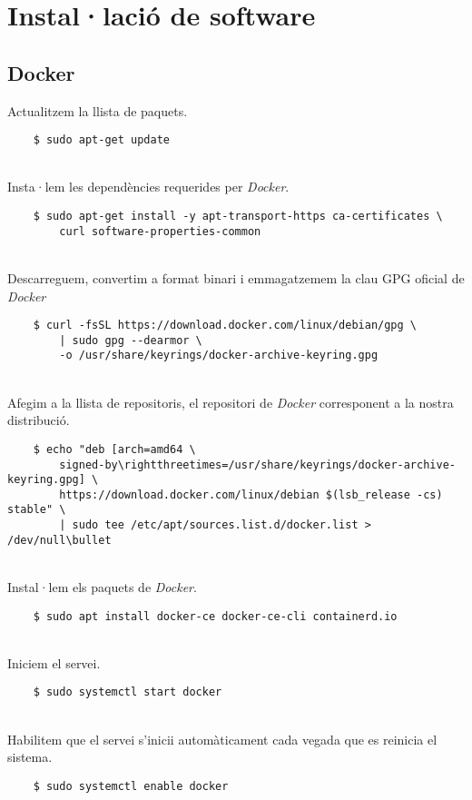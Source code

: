 \chapter{Instal·lació de software}\label{ch:software-installation}

\section{\gls{Docker}}\label{sec:docker-installation}

Actualitzem la llista de paquets.
\begin{verbatim}
    $ sudo apt-get update
\end{verbatim}

\noindent \\
    Insta·lem les dependències requerides per \textit{\gls{Docker}}.
\begin{verbatim}
    $ sudo apt-get install -y apt-transport-https ca-certificates \
        curl software-properties-common
\end{verbatim}

\noindent \\
Descarreguem, convertim a format binari i emmagatzemem la clau GPG oficial de \textit{\gls{Docker}}
\begin{verbatim}
    $ curl -fsSL https://download.docker.com/linux/debian/gpg \
        | sudo gpg --dearmor \
        -o /usr/share/keyrings/docker-archive-keyring.gpg
\end{verbatim}

\noindent \\
Afegim a la llista de repositoris, el repositori de \textit{\gls{Docker}} corresponent a la nostra distribució.
\begin{verbatim}
    $ echo "deb [arch=amd64 \
        signed-by\rightthreetimes=/usr/share/keyrings/docker-archive-keyring.gpg] \
        https://download.docker.com/linux/debian $(lsb_release -cs) stable" \
        | sudo tee /etc/apt/sources.list.d/docker.list > /dev/null\bullet
\end{verbatim}

\noindent \\
Instal·lem els paquets de \textit{\gls{Docker}}.
\begin{verbatim}
    $ sudo apt install docker-ce docker-ce-cli containerd.io
\end{verbatim}

\noindent \\
Iniciem el servei.
\begin{verbatim}
    $ sudo systemctl start docker
\end{verbatim}

\noindent \\
Habilitem que el servei s'inicii automàticament cada vegada que es reinicia el sistema.
\begin{verbatim}
    $ sudo systemctl enable docker
\end{verbatim}
